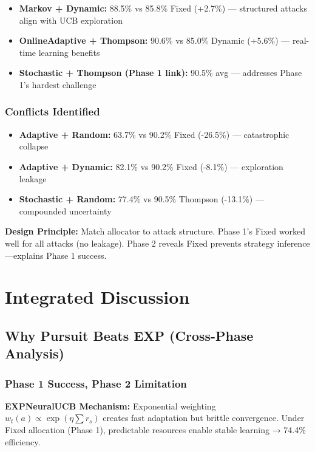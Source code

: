 \documentclass[11pt,a4paper]{article}
\newcommand{\critical}[1]{\textcolor{criticalcolor}{\textbf{#1}}}
\newcommand{\success}[1]{\textcolor{successcolor}{\textbf{#1}}}
\begin{document}
\begin{itemize}
\item \success{Markov + Dynamic:} 88.5\% vs 85.8\% Fixed (+2.7\%) — structured attacks align with UCB exploration
\item \success{OnlineAdaptive + Thompson:} 90.6\% vs 85.0\% Dynamic (+5.6\%) — real-time learning benefits
\item \success{Stochastic + Thompson (Phase 1 link):} 90.5\% avg — addresses Phase 1's hardest challenge
\end{itemize}

\subsubsection{Conflicts Identified}

\begin{itemize}
\item \critical{Adaptive + Random:} 63.7\% vs 90.2\% Fixed (-26.5\%) — catastrophic collapse
\item \critical{Adaptive + Dynamic:} 82.1\% vs 90.2\% Fixed (-8.1\%) — exploration leakage
\item \critical{Stochastic + Random:} 77.4\% vs 90.5\% Thompson (-13.1\%) — compounded uncertainty
\end{itemize}

\textbf{Design Principle:} Match allocator to attack structure. Phase 1's Fixed worked well for all attacks (no leakage). Phase 2 reveals Fixed prevents strategy inference—explains Phase 1 success.

\section{Integrated Discussion}

\subsection{Why Pursuit Beats EXP (Cross-Phase Analysis)}

\subsubsection{Phase 1 Success, Phase 2 Limitation}

\textbf{EXPNeuralUCB Mechanism:} Exponential weighting $w_t(a) \propto \exp(\eta \sum r_s)$ creates fast adaptation but brittle convergence. Under Fixed allocation (Phase 1), predictable resources enable stable learning → 74.4\% efficiency.
\end{document}
